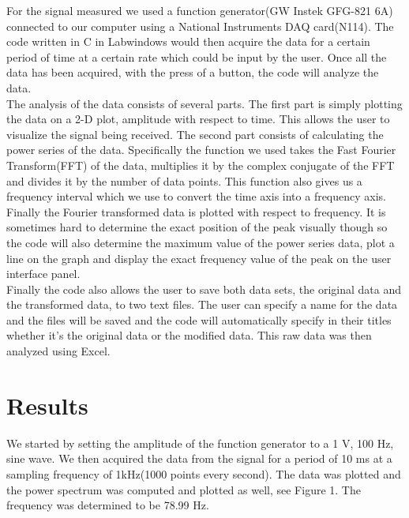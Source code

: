 \documentclass{article}
\begin{document}
For the signal measured we used a function generator(GW Instek GFG-821 6A) connected to our computer using a National Instruments DAQ card(N114).  The code written in C in Labwindows would then acquire the data for a certain period of time at a certain rate which could be input by the user.  Once all the data has been acquired, with the press of a button, the code will analyze the data.
\\
The analysis of the data consists of several parts.  The first part is simply plotting the data on a 2-D plot, amplitude with respect to time.  This allows the user to visualize the signal being received.  The second part consists of calculating the power series of the data.  Specifically the function we used takes the Fast Fourier Transform(FFT) of the data, multiplies it by the complex conjugate of the FFT and divides it by the number of data points.  This function also gives us a frequency interval which we use to convert the time axis into a frequency axis.  Finally the Fourier transformed data is plotted with respect to frequency.  It is sometimes hard to determine the exact position of the peak visually though so the code will also determine the maximum value of the power series data, plot a line on the graph and display the exact frequency value of the peak on the user interface panel.  
\\
Finally the code also allows the user to save both data sets, the original data and the transformed data, to two text files.  The user can specify a name for the data and the files will be saved and the code will automatically specify in their titles whether it's the original data or the modified data.  This raw data was then analyzed using Excel.

\section{Results}

We started by setting the amplitude of the function generator to a 1 V, 100 Hz, sine wave.  We then acquired the data from the signal for a period of 10 ms at a sampling frequency of 1kHz(1000 points every second).  The data was plotted and the power spectrum was computed and plotted as well, see Figure 1.  The frequency was determined to be 78.99 Hz.
\end{document}
